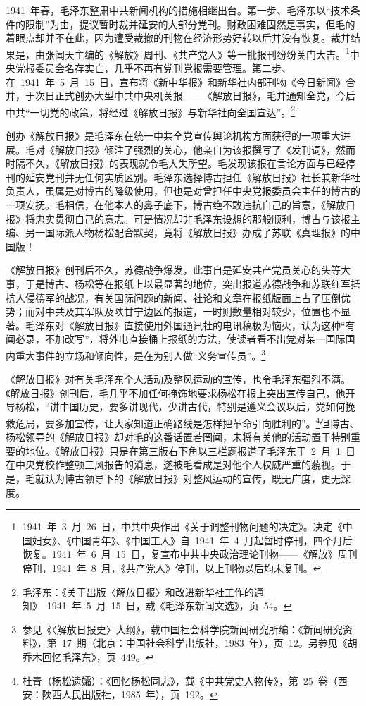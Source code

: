 1941~年春，毛泽东整肃中共新闻机构的措施相继出台。第一步、毛泽东以“技术条件的限制”为由，提议暂时裁并延安的大部分党刊。财政困难固然是事实，但毛的着眼点却并不在此，因为遭受裁撤的刊物在经济形势好转以后并没有恢复。裁并结果是，由张闻天主编的《解放》周刊、《共产党人》等一批报刊纷纷关门大吉。\footnote{1941~年~3~月~26~日，中共中央作出《关于调整刊物问题的决定》。决定《中国妇女》、《中国青年》、《中国工人》自~1941~年~4~月起暂时停刊，四个月后恢复。1941~年~6~月~15~日，复宣布中共中央政治理论刊物——《解放》周刊停刊，1941~年~8~月，《共产党人》停刊，以上刊物以后均未复刊。}中央党报委员会名存实亡，几乎不再有党刊党报需要管理。第二步、在~1941~年~5~月~15~日，宣布将《新中华报》和新华社内部刊物《今日新闻》合并，于次日正式创办大型中共中央机关报——《解放日报》，毛并通知全党，今后中共“一切党的政策，将经过《解放日报》与新华社向全国宣达”。\footnote{毛泽东：《关于出版〈解放日报〉和改进新华社工作的通知》~1941~年~5~月~15~日，载《毛泽东新闻文选》，页~54。}

创办《解放日报》是毛泽东在统一中共全党宣传舆论机构方面获得的一项重大进展。毛对《解放日报》倾注了强烈的关心，他亲自为该报撰写了《发刊词》，然而时隔不久，《解放日报》的表现就令毛大失所望。毛发现该报在言论方面与已经停刊的延安党刊并无任何实质区别。毛泽东选择博古担任《解放日报》社长兼新华社负责人，虽属是对博古的降级使用，但也是对曾担任中央党报委员会主任的博古的一项安抚。毛相信，在他本人的鼻子底下，博古绝不敢违抗自己的旨意，《解放日报》将忠实贯彻自己的意志。可是情况却非毛泽东设想的那般顺利，博古与该报主编、另一国际派人物杨松配合默契，竟将《解放日报》办成了苏联《真理报》的中国版！

《解放日报》创刊后不久，苏德战争爆发，此事自是延安共产党员关心的头等大事，于是博古、杨松等在报纸上以最显著的地位，突出报道苏德战争和苏联红军抵抗人侵德军的战况，有关国际问题的新闻、社论和文章在报纸版面上占了压倒优势；而对中共及其军队及陕甘宁边区的报道，一时则数量相对较少，位置也不显著。毛泽东对《解放日报》直接使用外国通讯社的电讯稿极为恼火，认为这种“有闻必录，不加改写”，将外电直接桶上报纸的方法，使读者看不出党对某一国际国内重大事件的立场和倾向性，是在为别人做“义务宣传员”。\footnote{参见《〈解放日报史〉大纲》，载中国社会科学院新闻研究所编：《新闻研究资料》，第~17~期（北京：中国社会科学出版社，1983~年），页~12。另参见《胡乔木回忆毛泽东》，页~449。}

《解放日报》对有关毛泽东个人活动及整风运动的宣传，也令毛泽东强烈不满。《解放日报》创刊后，毛几乎不加任何掩饰地要求杨松在报上突出宣传自己，他开导杨松，“讲中国历史，要多讲现代，少讲古代，特别是遵义会议以后，党如何挽救危局，要多加宣传，让大家知道正确路线是怎样把革命引向胜利的”。\footnote{杜青（杨松遗孀）：《回忆杨松同志》，载《中共党史人物传》，第~25~卷（西安：陕西人民出版社，1985~年），页~192。}但博古、杨松领导的《解放日报》却对毛的这番话置若罔闻，未将有关他的活动置于特别重要的地位。《解放日报》只是在第三版右下角以三栏题报道了毛泽东于~2~月~1~日在中央党校作整顿三风报告的消息，遂被毛看成是对他个人权威严重的藐视。于是，毛就认为博古领导下的《解放日报》对整风运动的宣传，既无广度，更无深度。

